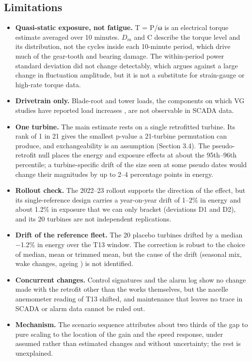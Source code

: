 \documentclass[preprint,12pt]{elsarticle}
\begin{document}
\subsection{Limitations}

\begin{itemize}
\item
  \textbf{Quasi-static exposure, not fatigue.} T = P/ω is an electrical torque estimate averaged over 10 minutes. \(D_{m}\) and C describe the torque level and its distribution, not the cycles inside each 10-minute period, which drive much of the gear-tooth and bearing damage. The within-period power standard deviation did not change detectably, which argues against a large change in fluctuation amplitude, but it is not a substitute for strain-gauge or high-rate torque data.
\item
  \textbf{Drivetrain only.} Blade-root and tower loads, the components on which VG studies have reported load increases \cite{kim,bak}, are not observable in SCADA data.
\item
  \textbf{One turbine.} The main estimate rests on a single retrofitted turbine. Its rank of 1 in 21 gives the smallest p-value a 21-turbine permutation can produce, and exchangeability is an assumption (Section 3.4). The pseudo-retrofit null places the energy and exposure effects at about the 95th--96th percentile; a turbine-specific drift of the size seen at some pseudo dates would change their magnitudes by up to 2--4 percentage points in energy.
\item
  \textbf{Rollout check.} The 2022--23 rollout supports the direction of the effect, but its single-reference design carries a year-on-year drift of 1--2\% in energy and about 1.2\% in exposure that we can only bracket (deviations D1 and D2), and its 20 turbines are not independent replications.
\item
  \textbf{Drift of the reference fleet.} The 20 placebo turbines drifted by a median −1.2\% in energy over the T13 window. The correction is robust to the choice of median, mean or trimmed mean, but the cause of the drift (seasonal mix, wake changes, ageing \cite{staffell14}) is not identified.
\item
  \textbf{Concurrent changes.} Control signatures and the alarm log show no change made with the retrofit other than the works themselves, but the nacelle anemometer reading of T13 shifted, and maintenance that leaves no trace in SCADA or alarm data cannot be ruled out.
\item
  \textbf{Mechanism.} The scenario sequence attributes about two thirds of the gap to pure scaling to the location of the gain and the speed response, under assumed rather than estimated changes and without uncertainty; the rest is unexplained.

\end{itemize}
\end{document}
